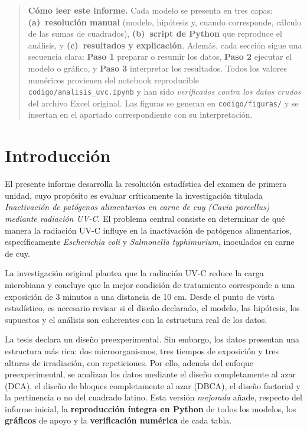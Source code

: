 \documentclass[12pt,a4paper]{article}
\begin{document}
\begin{quote}
\small \textbf{Cómo leer este informe.} Cada modelo se presenta en tres capas: \textbf{(a)~resolución manual} (modelo, hipótesis y, cuando corresponde, cálculo de las sumas de cuadrados), \textbf{(b)~script de Python} que reproduce el análisis, y \textbf{(c)~resultados y explicación}. Además, cada sección sigue una secuencia clara: \textbf{Paso 1} preparar o resumir los datos, \textbf{Paso 2} ejecutar el modelo o gráfico, y \textbf{Paso 3} interpretar los resultados. Todos los valores numéricos provienen del notebook reproducible \texttt{codigo/analisis\_uvc.ipynb} y han sido \emph{verificados contra los datos crudos} del archivo Excel original. Las figuras se generan en \texttt{codigo/figuras/} y se insertan en el apartado correspondiente con su interpretación.
\end{quote}

\newpage
\tableofcontents
\newpage

\section{Introducción}

El presente informe desarrolla la resolución estadística del examen de primera unidad, cuyo propósito es evaluar críticamente la investigación titulada \textit{Inactivación de patógenos alimentarios en carne de cuy (Cavia porcellus) mediante radiación UV-C}. El problema central consiste en determinar de qué manera la radiación UV-C influye en la inactivación de patógenos alimentarios, específicamente \textit{Escherichia coli} y \textit{Salmonella typhimurium}, inoculados en carne de cuy.

La investigación original plantea que la radiación UV-C reduce la carga microbiana y concluye que la mejor condición de tratamiento corresponde a una exposición de 3 minutos a una distancia de 10 cm. Desde el punto de vista estadístico, es necesario revisar si el diseño declarado, el modelo, las hipótesis, los supuestos y el análisis son coherentes con la estructura real de los datos.

La tesis declara un diseño preexperimental. Sin embargo, los datos presentan una estructura más rica: dos microorganismos, tres tiempos de exposición y tres alturas de irradiación, con repeticiones. Por ello, además del enfoque preexperimental, se analizan los datos mediante el diseño completamente al azar (DCA), el diseño de bloques completamente al azar (DBCA), el diseño factorial y la pertinencia o no del cuadrado latino. Esta versión \emph{mejorada} añade, respecto del informe inicial, la \textbf{reproducción íntegra en Python} de todos los modelos, los \textbf{gráficos} de apoyo y la \textbf{verificación numérica} de cada tabla.
\end{document}
